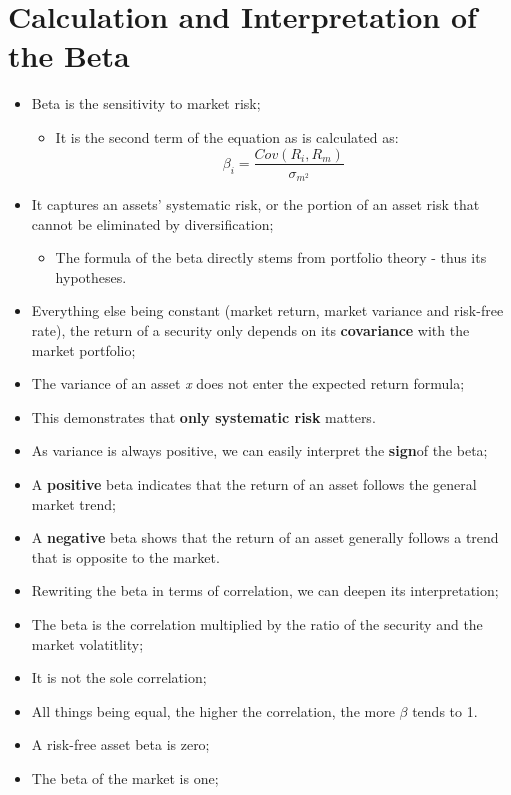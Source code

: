 \documentclass[11pt,a4paper]{report}
\begin{document}
\section{Calculation and Interpretation of the Beta}
\begin{itemize}
    \item Beta is the sensitivity to market risk;
    \begin{itemize}
        \item It is the second term of the equation as is calculated as:
        \[\beta_i = \frac{Cov(R_i,R_m)}{\sigma_{m^2}}\]
    \end{itemize}
    \item It captures an assets' systematic risk, or the portion of an asset risk that cannot be eliminated by diversification;
    \begin{itemize}
        \item The formula of the beta directly stems from portfolio theory - thus its hypotheses.
    \end{itemize}
    \item Everything else being constant (market return, market variance and risk-free rate), the return of a security only depends on its \textbf{covariance} with the market portfolio;
    \item The variance of an asset \textit{x} does not enter the expected return formula;
    \item This demonstrates that \textbf{only systematic risk} matters.
    \item As variance is always positive, we can easily interpret the \textbf{sign}of the beta;
    \item A \textbf{positive} beta indicates that the return of an asset follows the general market trend;
    \item A \textbf{negative} beta shows that the return of an asset generally follows a trend that is opposite to the market.
    \item Rewriting the beta in terms of correlation, we can deepen its interpretation;
    \item The beta is the correlation multiplied by the ratio of the security and the market volatitlity;
    \item It is not the sole correlation;
    \item All things being equal, the higher the correlation, the more $\beta$ tends to 1.
    \item A risk-free asset beta is zero;
    \item The beta of the market is one;

\end{itemize}
\end{document}
